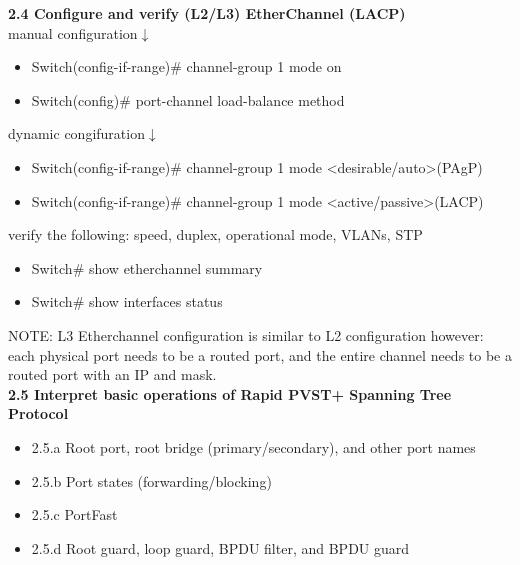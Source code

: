 \documentclass{article}
\begin{document}
\noindent\textbf{2.4 Configure and verify (L2/L3) EtherChannel (LACP)}\\

manual configuration$\downarrow$
\begin{itemize}
\item Switch(config-if-range)\# channel-group 1 mode on
\item Switch(config)\# port-channel load-balance method
\end{itemize}

dynamic congifuration$\downarrow$
\begin{itemize}
\item Switch(config-if-range)\# channel-group 1 mode \textless desirable/auto\textgreater (PAgP)
\item Switch(config-if-range)\# channel-group 1 mode \textless active/passive\textgreater (LACP)
\end{itemize}

verify the following: speed, duplex, operational mode, VLANs, STP
\begin{itemize}
\item Switch\# show etherchannel summary
\item Switch\# show interfaces status
\end{itemize}

NOTE: L3 Etherchannel configuration is similar to L2 configuration however: each physical port needs to be a routed port, and the entire channel needs to be a routed port with an IP and mask.\\

  
\noindent\textbf{2.5 Interpret basic operations of Rapid PVST+ Spanning Tree Protocol}
\begin{itemize}
\item 2.5.a Root port, root bridge (primary/secondary), and other port names
\item 2.5.b Port states (forwarding/blocking)
\item 2.5.c PortFast
\item 2.5.d Root guard, loop guard, BPDU filter, and BPDU guard
\end{itemize}
\end{document}
